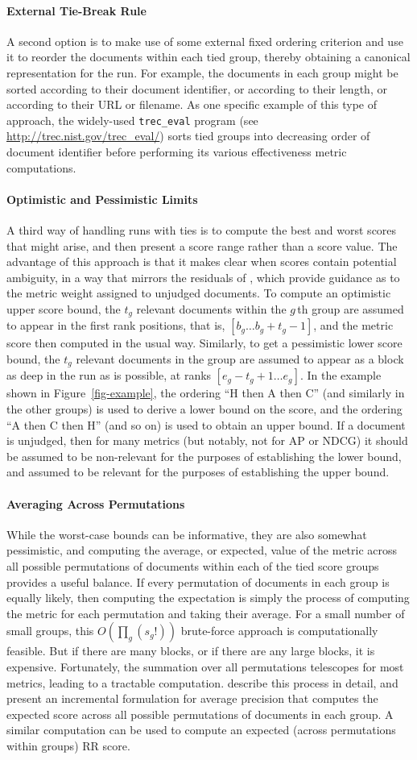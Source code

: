\documentclass[runningheads,a4paper]{llncs}
\newcommand{\myparagraph}[1]{\vspace*{-0.7ex}\paragraph*{\normalsize\bf{#1}}}
\newcommand{\treceval}{{\tt\small{trec\_eval}}}
\begin{document}
\myparagraph{External Tie-Break Rule}

A second option is to make use of some external fixed ordering
criterion and use it to reorder the documents within each tied group,
thereby obtaining a canonical representation for the run.
For example, the documents in each group might be sorted according to
their document identifier, or according to their length, or according
to their URL or filename.
As one specific example of this type of approach, the widely-used
{\treceval} program (see
{\small\url{http://trec.nist.gov/trec_eval/}}) sorts tied groups into
decreasing order of document identifier before performing its various
effectiveness metric computations.

\myparagraph{Optimistic and Pessimistic Limits}

A third way of handling runs with ties is to compute the best and
worst scores that might arise, and then present a score range rather
than a score value.
The advantage of this approach is that it makes clear when scores
contain potential ambiguity, in a way that mirrors the residuals of
{\citet{mz08acmtois}}, which provide guidance as to the metric weight
assigned to unjudged documents.
To compute an optimistic upper score bound, the $t_g$ relevant
documents within the $g$\,th group are assumed to appear in the
first rank positions, that is, $[b_g\ldots b_g+t_g-1]$, and the
metric score then computed in the usual way.
Similarly, to get a pessimistic lower score bound, the $t_g$ relevant
documents in the group are assumed to appear as a block as deep in
the run as is possible, at ranks $[e_g-t_g+1\ldots e_g]$.
In the example shown in Figure~\ref{fig-example}, the ordering ``H
then A then C'' (and similarly in the other groups) is used to derive
a lower bound on the score, and the ordering ``A then C then H'' (and
so on) is used to obtain an upper bound.
If a document is unjudged, then for many metrics (but notably, not
for AP or NDCG) it should be assumed to be non-relevant for the
purposes of establishing the lower bound, and assumed to be relevant
for the purposes of establishing the upper bound.

\myparagraph{Averaging Across Permutations}

While the worst-case bounds can be informative, they are also
somewhat pessimistic, and computing the average, or expected, value
of the metric across all possible permutations of documents within
each of the tied score groups provides a useful balance.
If every permutation of documents in each group is equally likely,
then computing the expectation is simply the process of computing the
metric for each permutation and taking their average.
For a small number of small groups, this $O(\prod_g (s_g!))$
brute-force approach is computationally feasible.
But if there are many blocks, or if there are any large blocks, it is
expensive.
Fortunately, the summation over all permutations telescopes for most
metrics, leading to a tractable computation.
{\citet{mn08ecir}} describe this process in detail, and present an
incremental formulation for average precision that computes the
expected score across all possible permutations of documents in each
group.
A similar computation can be used to compute an expected (across
permutations within groups) RR score.
\end{document}
